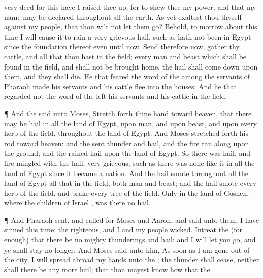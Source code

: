 {very
deed for this
{} have I raised thee
up, for to
shew
{} thee my
power; and that my
name may be
declared throughout all the
earth.
As yet
exaltest thou thyself against my
people, that thou wilt not let them
go?
Behold, to
morrow about this
time I will cause it to
rain a
very
grievous
hail, such as hath not
been in
Egypt
since the
foundation thereof even until now.
Send therefore now,
{}
gather thy
cattle, and all that thou hast in the
field;
{} every
man and
beast which shall be
found in the
field, and shall not be
brought
home, the
hail shall come
down upon them, and they shall
die.
He that
feared the
word of the
{} among the
servants of
Pharaoh made his
servants and his
cattle
flee into the
houses:
And he that
regarded not the
word of the
{}
left his
servants and his
cattle in the
field.
\par }{\PP {}¶ And the
{}
said unto
Moses, Stretch
forth thine
hand toward
heaven, that there may be
hail in all the
land of
Egypt, upon
man, and upon
beast, and upon every
herb of the
field, throughout the
land of
Egypt.
And
Moses stretched
forth his
rod toward
heaven: and the
{}
sent
thunder and
hail, and the
fire ran
along upon the
ground; and the
{}
rained
hail upon the
land of
Egypt.
So there was
hail, and
fire
mingled with the
hail,
very
grievous, such as there was
none like it in all the
land of
Egypt since it became a
nation.
And the
hail
smote throughout all the
land of
Egypt all that
{} in the
field, both
man and
beast; and the
hail
smote every
herb of the
field, and
brake every
tree of the
field.
Only in the
land of
Goshen, where the
children of
Israel
{}, was there no
hail.
\par }{\PP {}¶ And
Pharaoh
sent, and
called for
Moses and
Aaron, and
said unto them, I have
sinned this
time: the
{}
{}
righteous, and I and my
people
{}
wicked.
Intreat the
{} (for
{}
enough) that there be no
{}
mighty
thunderings and
hail; and I will let you
go, and ye shall
stay no
longer.
And
Moses
said unto him, As soon as I am gone
out of the
city, I will spread
abroad my
hands unto the
{};
{} the
thunder shall
cease, neither shall there be any more
hail; that thou mayest
know how that the
}
